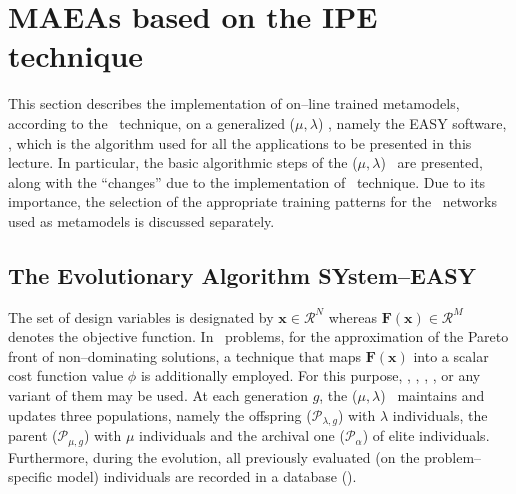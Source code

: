 \documentclass{vki_ls}
\newcommand{\vect}[1]{\bm{#1}}
\newcommand{\set}[1]{\mathcal{#1}}
\begin{document}
\section[MAEAs based on the IPE technique]
{MAEAs based on the IPE technique}
\label{s:MaeasIpe}

This section describes the implementation of on--line trained metamodels, according to the \IPE\ technique, on a generalized ($\mu,\lambda$) \EA, namely the EASY software, \cite{EASYsite}, which is the algorithm used for all the applications to be presented in this lecture.
In particular, the basic algorithmic steps of the ($\mu,\lambda$) \EA\ are presented, along with the ``changes'' due to the implementation of \IPE\ technique.
Due to its importance, the selection of the appropriate training patterns for the \RBF\ networks used as metamodels is discussed separately.

\subsection[The Evolutionary Algorithm SYstem]
{The Evolutionary Algorithm SYstem--EASY}
\label{ss:easy}

The set of design variables is designated by 
$\vect{x}\!\in\!\set{R}^N$ whereas
$\vect{F}(\vect{x})\!\in\!\set{R}^M$ denotes the objective function. 
In \MOO\ problems, for the approximation of the Pareto front of non--dominating solutions, a technique that maps $\vect{F}(\vect{x})$ into a scalar cost function value $\phi$ is additionally employed. For this purpose, \SPEA \cite{Zitz1999a}, \SPEAA \cite{Zitz2002}, \NSGA \cite{Sri1995}, \NSGAA \cite{Deb2000}, or any variant of them may be used. 
At each generation $g$, the ($\mu,\lambda$) \EA\ maintains and updates three populations, namely the offspring ($\set{P}_{\lambda,g}$) with $\lambda$ individuals, the parent ($\set{P}_{\mu,g}$) with $\mu$ individuals and the archival one ($\set{P}_\alpha$) of elite individuals. Furthermore, during the evolution, all previously evaluated (on the problem--specific model) individuals are recorded in a database (\DB).
\end{document}
